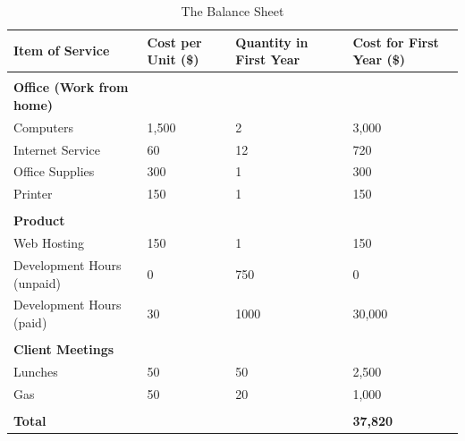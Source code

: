 \begin{table}[ht]
\caption{The Balance Sheet} %
\centering %
\begin{tabular}{| l | p{1in} | p{1in} | p{1in} |} %
\hline
{\bf Item of Service} & {\bf Cost per Unit  (\$)} &  {\bf Quantity in First Year } &  {\bf Cost for First Year (\$) } \\
\hline
 &   &   &   \\
{\bf Office (Work from home)} & & & \\
	Computers & 1,500 & 2 & 3,000 \\
	Internet Service & 60 & 12 & 720 \\
	Office Supplies & 300 & 1 & 300 \\
	Printer & 150 & 1 & 150 \\
 &   &   &   \\
{\bf Product} &   &   &   \\
	Web Hosting & 150 & 1 & 150 \\
	Development Hours (unpaid) & 0 & 750 & 0 \\
	Development Hours (paid) & 30 & 1000 & 30,000 \\
  &   &   &   \\
{\bf Client Meetings} &   &   &   \\
	Lunches & 50 &  50 & 2,500\\
	Gas & 50 & 20 & 1,000 \\
 &   &  &   \\ 
{\bf Total} &   &   & {\bf 37,820} \\
\hline
\end{tabular}
\label{balanceSheet} %
\end{table}

